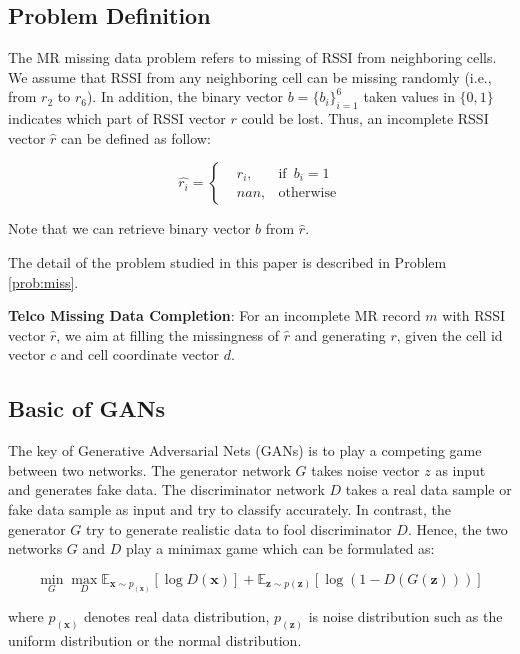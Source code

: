 \subsection{Problem Definition}
The MR missing data problem refers to missing of RSSI from neighboring cells. We assume that RSSI from any neighboring cell can be missing randomly (i.e., from $r_2$ to $r_6$). In addition, the binary vector $b=\{b_i\}_{i=1}^6$ taken values in $\{0, 1\}$ indicates which part of RSSI vector $r$ could be lost. Thus, an incomplete RSSI vector $\hat{r}$ can be defined as follow:

\begin{equation}\label{eq:rssi}
\hat{r_i}=\left\{
\begin{aligned}
&r_i, & \text{if}\enspace b_i=1 \\
&nan,  & \text{otherwise}
\end{aligned}
\right.
\end{equation}

Note that we can retrieve binary vector $b$ from $\hat{r}$.

The detail of the problem studied in this paper is described in Problem \ref{prob:miss}.

\begin{problem}\label{prob:miss}
  \textbf{Telco Missing Data Completion}: For an incomplete MR record $m$ with RSSI vector $\hat{r}$, we aim at filling the missingness of $\hat{r}$ and generating $r$, given the cell id vector $c$ and cell coordinate vector $d$.
\end{problem}

\subsection{Basic of GANs}
The key of Generative Adversarial Nets (GANs) \cite{DBLP:conf/nips/GoodfellowPMXWOCB14} is to play a competing game between two networks. The generator network $G$ takes noise vector $z$ as input and generates fake data. The discriminator network $D$ takes a real data sample or fake data sample as input and try to classify accurately. In contrast, the generator $G$ try to generate realistic data to fool discriminator $D$. Hence, the two networks $G$ and $D$ play a minimax game which can be formulated as:

\begin{equation}\label{eq:gan}
  \min\limits_G \max\limits_D \mathbb{E}_{\textbf{x}\sim p_(\textbf{x})}[\log D(\textbf{x})]+\mathbb{E}_{\textbf{z}\sim p( \textbf{z})}[\log(1-D(G(\textbf{z})))]
\end{equation}

where $p_(\textbf{x})$ denotes real data distribution, $p_(\textbf{z})$ is noise distribution such as the uniform distribution or the normal distribution. 